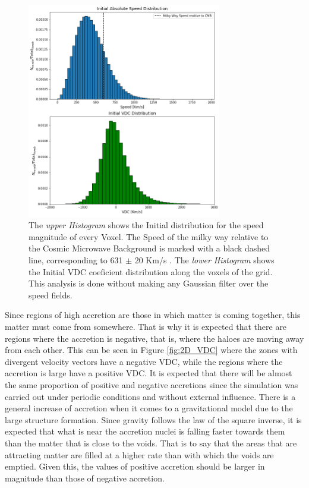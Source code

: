 \documentclass[a4paper,fleqn,usenatbib]{mnras}
\begin{document}
\begin{figure}
    \centering
    \includegraphics[width=240pt]{V_VDC_0.png}
    \caption{ The \textit{upper Histogram} shows the Initial distribution for the speed magnitude of every Voxel. The Speed of the milky way relative to the Cosmic Microwave Background is marked with a black dashed line, corresponding to 631 $\pm$  20 Km/s . The \textit{lower Histogram} shows the Initial VDC coeficient distribution along the voxels of the grid. This analysis is done without making any Gaussian filter over the speed fields.}
    \label{fig:SpeedDistribution}
\end{figure}

Since regions of high accretion are those in which matter is coming together, this matter must come from somewhere. That is why it is expected that there are regions where the accretion is negative, that is, where the haloes are moving away from each other. This can be seen in Figure \ref{fig:2D_VDC} where the zones with divergent velocity vectors have a negative VDC, while the regions where the accretion is large have a positive VDC.
It is expected that there will be almost the same proportion of positive and negative accretions since the simulation was carried out under periodic conditions and without external influence. There is a general increase of accretion when it comes to a gravitational model due to the large structure formation. Since gravity follows the law of the square inverse, it is expected that what is near the accretion nuclei is falling faster towards them than the matter that is close to the voids. That is to say that the areas that are attracting matter are filled at a higher rate than with which the voids are emptied. Given this, the values of positive accretion should be larger in magnitude than those of negative accretion.
\end{document}

